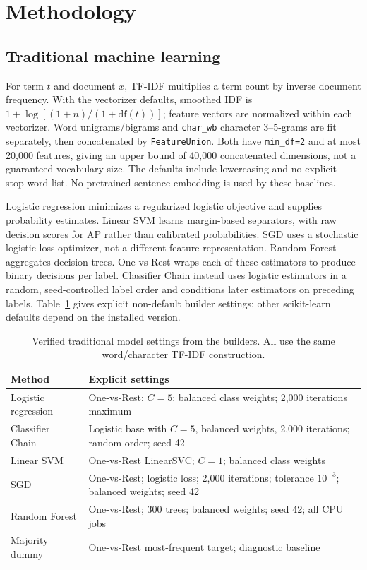 \section{Methodology}
\subsection{Traditional machine learning}
For term $t$ and document $x$, TF-IDF multiplies a term count by inverse document frequency. With the vectorizer defaults, smoothed IDF is $1+\log[(1+n)/(1+\mathrm{df}(t))]$; feature vectors are normalized within each vectorizer. Word unigrams/bigrams and \texttt{char\_wb} character 3--5-grams are fit separately, then concatenated by \texttt{FeatureUnion}. Both have \texttt{min\_df=2} and at most 20,000 features, giving an upper bound of 40,000 concatenated dimensions, not a guaranteed vocabulary size. The defaults include lowercasing and no explicit stop-word list. No pretrained sentence embedding is used by these baselines.

Logistic regression minimizes a regularized logistic objective and supplies probability estimates. Linear SVM learns margin-based separators, with raw decision scores for AP rather than calibrated probabilities. SGD uses a stochastic logistic-loss optimizer, not a different feature representation. Random Forest aggregates decision trees. One-vs-Rest wraps each of these estimators to produce binary decisions per label. Classifier Chain instead uses logistic estimators in a random, seed-controlled label order and conditions later estimators on preceding labels. Table~\ref{tab:mlconfig} gives explicit non-default builder settings; other scikit-learn defaults depend on the installed version.

\begin{table}[htbp]\centering\small
\caption{Verified traditional model settings from the builders. All use the same word/character TF-IDF construction.}\label{tab:mlconfig}
\begin{tabularx}{\linewidth}{lX}\toprule
Method & Explicit settings\\\midrule
Logistic regression & One-vs-Rest; $C=5$; balanced class weights; 2,000 iterations maximum\\
Classifier Chain & Logistic base with $C=5$, balanced weights, 2,000 iterations; random order; seed 42\\
Linear SVM & One-vs-Rest LinearSVC; $C=1$; balanced class weights\\
SGD & One-vs-Rest; logistic loss; 2,000 iterations; tolerance $10^{-3}$; balanced weights; seed 42\\
Random Forest & One-vs-Rest; 300 trees; balanced weights; seed 42; all CPU jobs\\
Majority dummy & One-vs-Rest most-frequent target; diagnostic baseline\\\bottomrule
\end{tabularx}\end{table}


